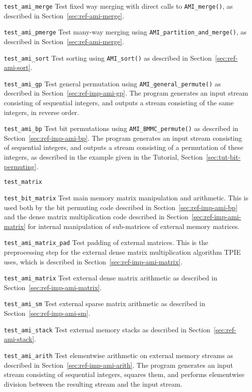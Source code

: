 \begin{description}
\item\lstinline|test_ami_merge| Test fixed way merging with direct
  calls to \lstinline|AMI_merge()|, as described in
  Section~\ref{sec:ref-ami-merge}.
\item\lstinline|test_ami_pmerge| Test many-way merging using
  \lstinline|AMI_partition_and_merge()|, as described in
  Section~\ref{sec:ref-ami-merge}.
\item\lstinline|test_ami_sort| Test sorting using
  \lstinline|AMI_sort()| as described in
  Section~\ref{sec:ref-ami-sort}.
\item\lstinline|test_ami_gp| Test general permutation using
  \lstinline|AMI_general_permute()| as described in
  Section~\ref{sec:ref-imp-ami-gp}.  The program generates an input
  stream consisting of sequential integers, and outputs a stream
  consisting of the same integers, in reverse order.
\item\lstinline|test_ami_bp| Test bit permutations using
  \lstinline|AMI_BMMC_permute()| as described in
  Section~\ref{sec:ref-imp-ami-bp}.  The program generates an input
  stream consisting of sequential integers, and outputs a stream
  consisting of a permutation of these integers, as described in the
  example given in the Tutorial, Section~\ref{sec:tut-bit-permuting}.
\item\lstinline|test_matrix|
\item\lstinline|test_bit_matrix| Test main memory matrix manipulation
  and arithmetic.  This is used both by the bit permuting code
  described in Section~\ref{sec:ref-imp-ami-bp} and the dense matrix
  multiplication code described in Section~\ref{sec:ref-imp-ami-matrix}
  for internal manipulation of sub-matrices of external memory
  matrices.
\item\lstinline|test_ami_matrix_pad| Test padding of external
  matrices.  This is the preprocessing step for the external dense
  matrix multiplication algorithm TPIE uses, which is described in 
  Section~\ref{sec:ref-imp-ami-matrix}. 
\item\lstinline|test_ami_matrix| Test external dense matrix arithmetic
  as described in Section~\ref{sec:ref-imp-ami-matrix}.
\item\lstinline|test_ami_sm| Test external sparse matrix arithmetic as
  described in Section~\ref{sec:ref-imp-ami-sm}.
\item\lstinline|test_ami_stack| Test external memory stacks as
  described in Section~\ref{sec:ref-ami-stack}.
\item\lstinline|test_ami_arith| Test elementwise arithmetic on
  external memory streams as described in
  Section~\ref{sec:ref-imp-ami-arith}.  The program generates an input
  stream consisting of sequential integers, squares them, and performs
  elementwise division between the resulting stream and the input
  stream.
\end{description}

